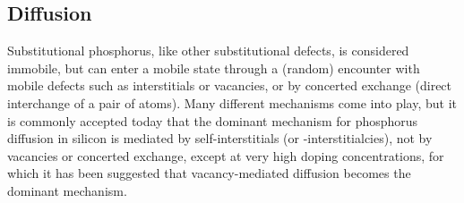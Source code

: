 \documentclass[11pt,bibliography=totoc,index=totoc]{scrbook}   %
\begin{document}








%
\subsection{Diffusion}\label{sec:PDiffusion}
%

Substitutional phosphorus, like other substitutional defects, is considered immobile, 
but can enter a mobile state through a (random) encounter with mobile defects such as interstitials or vacancies, 
or by concerted exchange (direct interchange of a pair of atoms).
Many different mechanisms come into play, but it is commonly accepted today that the dominant mechanism for phosphorus diffusion in silicon is mediated by self-interstitials (or -interstitialcies), 
not by vacancies or concerted exchange, except at very high doping concentrations, 
for which it has been suggested that vacancy-mediated diffusion becomes the dominant mechanism.\cite{Ural:1999,Bentzen:2006,Liu:2003}
\end{document}
